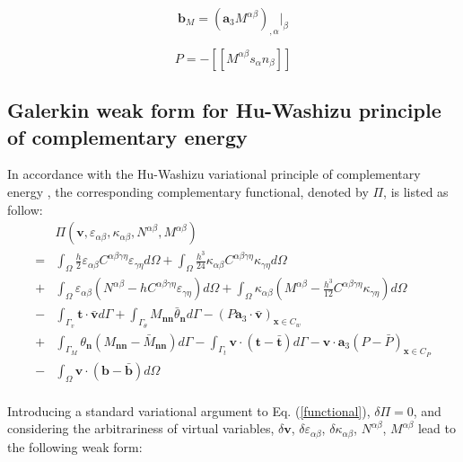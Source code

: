 \begin{equation}
\boldsymbol b_M = (\boldsymbol a_3 M^{\alpha\beta})_{,\alpha}\vert_\beta
\end{equation}

\begin{equation}
P = -[[M^{\alpha\beta}s_\alpha n_\beta]]
\end{equation}

\subsection{Galerkin weak form for Hu-Washizu principle of complementary energy}
In accordance with the Hu-Washizu variational principle of complementary energy \cite{dah-wei1985}, the corresponding complementary functional, denoted by $\Pi$, is listed as follow:
\begin{equation} \label{functional}
\begin{split}
&\Pi(\boldsymbol v, \varepsilon_{\alpha\beta},\kappa_{\alpha\beta},N^{\alpha\beta},M^{\alpha\beta}) \\
= &\int_\Omega \frac{h}{2}\varepsilon_{\alpha\beta} C^{\alpha\beta\gamma\eta}\varepsilon_{\gamma\eta}d\Omega 
+ \int_\Omega \frac{h^3}{24}\kappa_{\alpha\beta} C^{\alpha\beta\gamma\eta}\kappa_{\gamma\eta}d\Omega \\
+& \int_\Omega \varepsilon_{\alpha\beta} (N^{\alpha\beta} - h C^{\alpha\beta\gamma\eta} \varepsilon_{\gamma\eta}) d\Omega
+ \int_\Omega \kappa_{\alpha\beta} (M^{\alpha\beta} - \frac{h^3}{12} C^{\alpha\beta\gamma\eta} \kappa_{\gamma\eta}) d\Omega \\
-& \int_{\Gamma_v} \boldsymbol t \cdot \bar{\boldsymbol v} d\Gamma 
+ \int_{\Gamma_\theta} M_{\boldsymbol{nn}} \bar \theta_{\boldsymbol n} d\Gamma - (P \boldsymbol a_3 \cdot \bar{\boldsymbol v})_{\boldsymbol x \in C_w} \\
+ &\int_{\Gamma_M} \theta_{\boldsymbol n} (M_{\boldsymbol{nn}} - \bar M_{\boldsymbol{nn}}) d\Gamma
- \int_{\Gamma_t} \boldsymbol v \cdot (\boldsymbol t - \bar{\boldsymbol t})d\Gamma - \boldsymbol v \cdot \boldsymbol a_3 (P - \bar{P})_{\boldsymbol x \in C_P} \\
- &\int_\Omega \boldsymbol v \cdot (\boldsymbol b - \bar{\boldsymbol b}) d\Omega \\
\end{split}
\end{equation}

Introducing a standard variational argument to Eq. (\ref{functional}), $\delta \Pi=0$, and considering the arbitrariness of virtual variables, $\delta \boldsymbol v$, $\delta \varepsilon_{\alpha\beta}$, $\delta \kappa_{\alpha\beta}$, $N^{\alpha\beta}$, $M^{\alpha\beta}$ lead to the following weak form:


